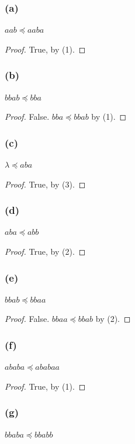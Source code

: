 \documentclass[14pt]{extarticle}
\begin{document}
\subsubsection{(a)}
\(aab \preceq aaba\)

\begin{proof}
True, by (1).
\end{proof}

\subsubsection{(b)}
\(bbab \preceq bba\)

\begin{proof}
False. \(bba \preceq bbab\) by (1).
\end{proof}

\subsubsection{(c)}
\(\lambda \preceq aba\)

\begin{proof}
True, by (3).
\end{proof}

\subsubsection{(d)}
\(aba \preceq abb\)

\begin{proof}
True, by (2).
\end{proof}

\subsubsection{(e)}
\(bbab \preceq bbaa\)

\begin{proof}
False. \(bbaa \preceq bbab\) by (2).
\end{proof}

\subsubsection{(f)}
\(ababa \preceq ababaa\)

\begin{proof}
True, by (1).
\end{proof}

\subsubsection{(g)}
\(bbaba \preceq bbabb\)
\end{document}
